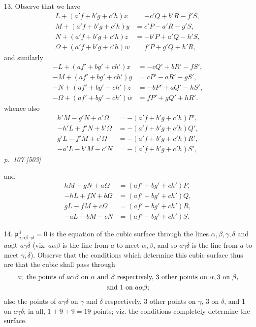 \documentclass[11pt,a4paper]{article}
\newcommand{\sourcepage}[2]{%
  \bigskip
  \noindent\textit{p.~#1 [#2]}%
  \par\smallskip
}
\newcommand{\p}{\mathfrak p}
\begin{document}
13. Observe that we have
\[
\begin{aligned}
L+(a'f+b'g+c'h)x&=-c'Q+b'R-f'S,\\
M+(a'f+b'g+c'h)y&= c'P-a'R-g'S,\\
N+(a'f+b'g+c'h)z&=-b'P+a'Q-h'S,\\
\Omega+(a'f+b'g+c'h)w&=f'P+g'Q+h'R,
\end{aligned}
\]
and similarly
\[
\begin{aligned}
-L+(af'+bg'+ch')x&=-cQ'+bR'-fS',\\
-M+(af'+bg'+ch')y&= cP'-aR'-gS',\\
-N+(af'+bg'+ch')z&=-bP'+aQ'-hS',\\
-\Omega+(af'+bg'+ch')w&=fP'+gQ'+hR'.
\end{aligned}
\]
whence also
\[
\begin{aligned}
h'M-g'N+a'\Omega&=-(a'f+b'g+c'h)P',\\
-h'L+f'N+b'\Omega&=-(a'f+b'g+c'h)Q',\\
g'L-f'M+c'\Omega&=-(a'f+b'g+c'h)R',\\
-a'L-b'M-c'N&=-(a'f+b'g+c'h)S',
\end{aligned}
\]
\sourcepage{107}{503}
and
\[
\begin{aligned}
hM-gN+a\Omega&=(af'+bg'+ch')P,\\
-hL+fN+b\Omega&=(af'+bg'+ch')Q,\\
gL-fM+c\Omega&=(af'+bg'+ch')R,\\
-aL-bM-cN&=(af'+bg'+ch')S.
\end{aligned}
\]

14. $\p^3_{a.\alpha\beta.\gamma\delta}=0$ is the equation of the cubic surface
through the lines $\alpha,\beta,\gamma,\delta$ and $a\alpha\beta$, $a\gamma\delta$
(viz. $a\alpha\beta$ is the line from $a$ to meet $\alpha,\beta$, and so
$a\gamma\delta$ is the line from $a$ to meet $\gamma,\delta$). Observe that the
conditions which determine this cubic surface thus are that the cubic shall pass
through
\[
\begin{gathered}
a;\ \hbox{the points of }a\alpha\beta\hbox{ on }\alpha\hbox{ and }\beta
\hbox{ respectively, 3 other points on }\alpha,3\hbox{ on }\beta,\\
\hbox{and 1 on }a\alpha\beta;
\end{gathered}
\]
also the points of $a\gamma\delta$ on $\gamma$ and $\delta$ respectively, 3 other
points on $\gamma$, 3 on $\delta$, and 1 on $a\gamma\delta$; in all, $1+9+9=19$
points; viz. the conditions completely determine the surface.
\end{document}
